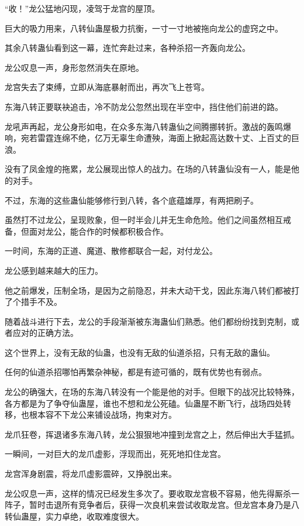 
\begin{this_body}

“收！”龙公猛地闪现，凌驾于龙宫的屋顶。

巨大的吸力用来，八转仙蛊屋极力抗衡，一寸一寸地被拖向龙公的虚窍之中。

其余八转蛊仙看到这一幕，连忙奔赴过来，各种杀招一齐轰向龙公。

龙公叹息一声，身形忽然消失在原地。

龙宫失去了束缚，立即从海底暴射而出，再次飞上苍穹。

东海八转正要联袂追击，冷不防龙公忽然出现在半空中，挡住他们前进的路。

龙吼声再起，龙公身形如电，在众多东海八转蛊仙之间腾挪转折。激战的轰鸣爆响，宛若雷霆连绵不绝，亿万无辜生命遭殃，海面上掀起高达数十丈、上百丈的巨浪。

没有了凤金煌的拖累，龙公展现出惊人的战力。在场的八转蛊仙没有一人，能是他的对手。

不过，东海的这些蛊仙能够修行到八转，各个底蕴雄厚，有两把刷子。

虽然打不过龙公，呈现败象，但一时半会儿并无生命危险。他们之间虽然相互戒备，但面对龙公，能合作的时候都积极合作。

一时间，东海的正道、魔道、散修都联合一起，对付龙公。

龙公感到越来越大的压力。

他之前爆发，压制全场，是因为之前隐忍，并未大动干戈，因此东海八转们都被打了个措手不及。

随着战斗进行下去，龙公的手段渐渐被东海蛊仙们熟悉。他们都纷纷找到克制，或者应对的正确方法。

这个世界上，没有无敌的仙蛊，也没有无敌的仙道杀招，只有无敌的蛊仙。

任何的仙道杀招哪怕再繁杂神秘，都是有迹可循的，既有优势也有弱点。

龙公的确强大，在场的东海八转没有一个能是他的对手。但眼下的战况比较特殊，各方都是为了争夺仙蛊屋，谁也不想和龙公死磕。仙蛊屋不断飞行，战场四处转移，也根本容不下龙公来铺设战场，拘束对方。

龙爪狂卷，挥退诸多东海八转，龙公狠狠地冲撞到龙宫之上，然后伸出大手猛抓。

一瞬间，一对巨大的龙爪虚影，浮现而出，死死地扣住龙宫。

龙宫浑身剧震，将龙爪虚影震碎，又挣脱出来。

龙公叹息一声，这样的情况已经发生多次了。要收取龙宫极不容易，他先得厮杀一阵子，暂时击退所有竞争者后，获得一次良机来尝试收取龙宫。但龙宫本身乃是八转仙蛊屋，实力卓绝，收取难度很大。


\end{this_body}

